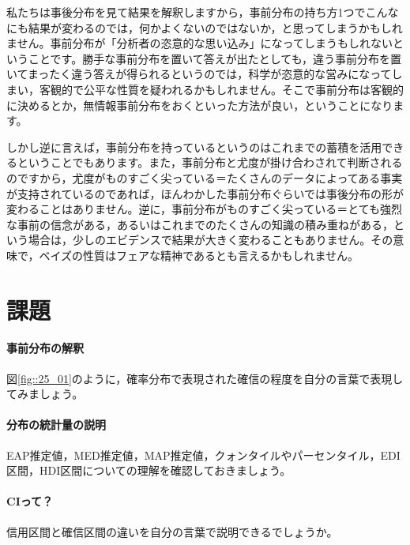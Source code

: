 \documentclass{ltjsbook}
\begin{document}
私たちは事後分布を見て結果を解釈しますから，事前分布の持ち方1つでこんなにも結果が変わるのでは，何かよくないのではないか，と思ってしまうかもしれません。事前分布が「分析者の恣意的な思い込み」になってしまうもしれないということです。勝手な事前分布を置いて答えが出たとしても，違う事前分布を置いてまったく違う答えが得られるというのでは，科学が恣意的な営みになってしまい，客観的で公平な性質を疑われるかもしれません。そこで事前分布は客観的に決めるとか，無情報事前分布をおくといった方法が良い，ということになります。

しかし逆に言えば，事前分布を持っているというのはこれまでの蓄積を活用できるということでもあります。また，事前分布と尤度が掛け合わされて判断されるのですから，尤度がものすごく尖っている＝たくさんのデータによってある事実が支持されているのであれば，ほんわかした事前分布ぐらいでは事後分布の形が変わることはありません。逆に，事前分布がものすごく尖っている＝とても強烈な事前の信念がある，あるいはこれまでのたくさんの知識の積み重ねがある，という場合は，少しのエビデンスで結果が大きく変わることもありません。その意味で，ベイズの性質はフェアな精神であるとも言えるかもしれません。


\section{課題}
\paragraph{事前分布の解釈}図\ref{fig::25_01}のように，確率分布で表現された確信の程度を自分の言葉で表現してみましょう。
\paragraph{分布の統計量の説明}EAP推定値，MED推定値，MAP推定値，クォンタイルやパーセンタイル，EDI区間，HDI区間についての理解を確認しておきましょう。
\paragraph{CIって？}信用区間と確信区間の違いを自分の言葉で説明できるでしょうか。
\end{document}
